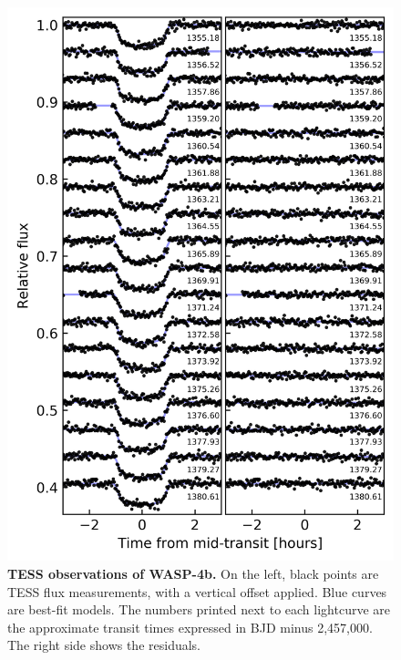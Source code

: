 \documentclass[12pt,twocolumn,tighten]{aastex62}
\begin{document}
{\begin{figure}[t]
    \begin{center}
		\includegraphics[height=0.97\textheight]{f1.png}
    \end{center}
    \vspace{-0.8cm}
    \caption{
      {\bf TESS observations of WASP-4b.} On the left, black points
      are TESS flux measurements, with a vertical offset applied. Blue
      curves are best-fit models. The numbers printed next to each
      lightcurve are the approximate transit times expressed in BJD
      minus 2{,}457{,}000.  The right side shows the residuals.
       \label{fig:lightcurves}
    }
\end{figure}

}
\end{document}
